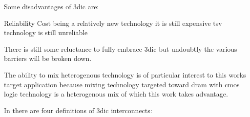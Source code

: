 Some disadvantages of \ac{3dic} are:
\begin{outline}
  \1 Reliability
  \1 Cost
    \2 being a relatively new technology it is still expensive 
    \2 \ac{tsv} technology is still unreliable
\end{outline}

There is still some reluctance to fully embrace \ac{3dic} but undoubtly the various barriers will be broken down.

The ability to mix heterogenous technology is of particular interest to this works target application because mixing technology targeted toward \ac{dram} with cmos logic technology is a heterogenous mix of which this work takes advantage.

In \cite{itrs2015_interconn} there are four definitions of \ac{3dic} interconnects:

